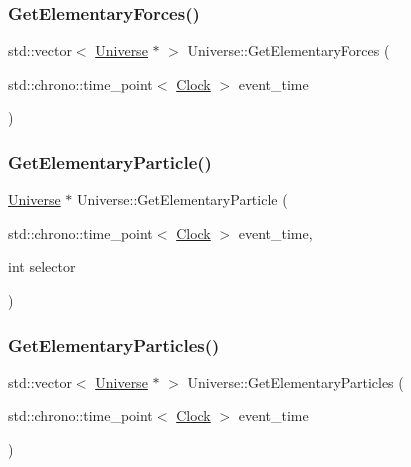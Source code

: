 \mbox{\label{classUniverse_a6a8ed579b2eedd3aceebda9f3d78aa0e}} 
\subsubsection{\texorpdfstring{Get\+Elementary\+Forces()}{GetElementaryForces()}}
{\footnotesize\ttfamily std\+::vector$<$ \mbox{\hyperlink{classUniverse}{Universe}} $\ast$ $>$ Universe\+::\+Get\+Elementary\+Forces (\begin{DoxyParamCaption}\item[{std\+::chrono\+::time\+\_\+point$<$ \mbox{\hyperlink{universe_8h_a0ef8d951d1ca5ab3cfaf7ab4c7a6fd80}{Clock}} $>$}]{event\+\_\+time }\end{DoxyParamCaption})}

\mbox{\label{classUniverse_acef54e17666d17078c522388f8f6e4f9}} 
\subsubsection{\texorpdfstring{Get\+Elementary\+Particle()}{GetElementaryParticle()}}
{\footnotesize\ttfamily \mbox{\hyperlink{classUniverse}{Universe}} $\ast$ Universe\+::\+Get\+Elementary\+Particle (\begin{DoxyParamCaption}\item[{std\+::chrono\+::time\+\_\+point$<$ \mbox{\hyperlink{universe_8h_a0ef8d951d1ca5ab3cfaf7ab4c7a6fd80}{Clock}} $>$}]{event\+\_\+time,  }\item[{int}]{selector }\end{DoxyParamCaption})}

\mbox{\label{classUniverse_a168fd9bf7602adcba1de5dd93a212775}} 
\subsubsection{\texorpdfstring{Get\+Elementary\+Particles()}{GetElementaryParticles()}}
{\footnotesize\ttfamily std\+::vector$<$ \mbox{\hyperlink{classUniverse}{Universe}} $\ast$ $>$ Universe\+::\+Get\+Elementary\+Particles (\begin{DoxyParamCaption}\item[{std\+::chrono\+::time\+\_\+point$<$ \mbox{\hyperlink{universe_8h_a0ef8d951d1ca5ab3cfaf7ab4c7a6fd80}{Clock}} $>$}]{event\+\_\+time }\end{DoxyParamCaption})}

